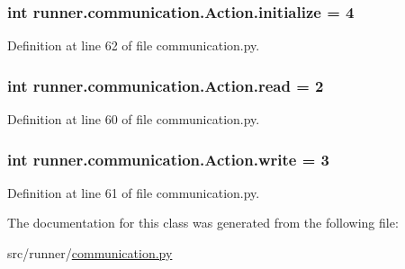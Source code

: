\hypertarget{classrunner_1_1communication_1_1Action_aea3aee926d631e7db6d4bbb866abbed9}{}
\subsubsection[{initialize}]{\setlength{\rightskip}{0pt plus 5cm}int runner.\+communication.\+Action.\+initialize = 4\hspace{0.3cm}{\ttfamily [static]}}\label{classrunner_1_1communication_1_1Action_aea3aee926d631e7db6d4bbb866abbed9}


Definition at line 62 of file communication.\+py.

\hypertarget{classrunner_1_1communication_1_1Action_a15efb8eb81879035e1b81cdc52f38ac8}{}
\subsubsection[{read}]{\setlength{\rightskip}{0pt plus 5cm}int runner.\+communication.\+Action.\+read = 2\hspace{0.3cm}{\ttfamily [static]}}\label{classrunner_1_1communication_1_1Action_a15efb8eb81879035e1b81cdc52f38ac8}


Definition at line 60 of file communication.\+py.

\hypertarget{classrunner_1_1communication_1_1Action_a78dfe8e8920c83252227f854cfd895e1}{}
\subsubsection[{write}]{\setlength{\rightskip}{0pt plus 5cm}int runner.\+communication.\+Action.\+write = 3\hspace{0.3cm}{\ttfamily [static]}}\label{classrunner_1_1communication_1_1Action_a78dfe8e8920c83252227f854cfd895e1}


Definition at line 61 of file communication.\+py.



The documentation for this class was generated from the following file\+:\begin{DoxyCompactItemize}
\item 
src/runner/\hyperlink{communication_8py}{communication.\+py}\end{DoxyCompactItemize}
